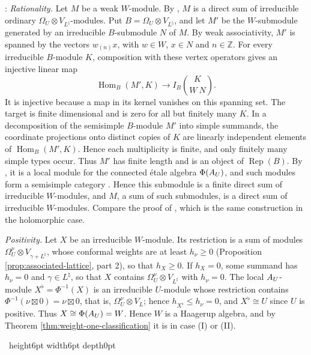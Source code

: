 \documentclass[leqno]{article}
\let\cal\relax
\newcommand{\cal}{\mathcal}
\newcommand{\Z}{\ensuremath{\mathbb{Z}}}
\renewcommand{\leq}{\ensuremath{\leqslant}}
\renewcommand{\geq}{\ensuremath{\geqslant}}
\newcommand{\qed}{\hfill \vrule height6pt  width6pt depth0pt}
\newcommand{\ot}{\otimes}
\DeclareMathOperator{\Rep}{Rep}
\newenvironment{proof}[1][]{\noindent {\it Proof #1} : }{\hbox{~}\qed
\smallskip
}
\numberwithin{equation}{section}
\begin{document}
\begin{proof}
\emph{Rationality.} Let $M$ be a weak $W$-module. By \cite{ABD04}, $M$ is a direct sum of irreducible ordinary $\Omega_U \ot V_{L^\natural}$-modules. Put $B = \Omega_U \ot V_{L^\natural}$, and let $M'$ be the $W$-submodule generated by an irreducible $B$-submodule $N$ of $M$. By weak associativity, $M'$ is spanned by the vectors $w_{(n)}x$, with $w \in W$, $x \in N$ and $n \in \Z$. For every irreducible $B$-module $K$, composition with these vertex operators gives an injective linear map
\[
\operatorname{Hom}_B(M',K) \to I_B\binom{K}{W\ N}.
\]
It is injective because a map in its kernel vanishes on this spanning set. The target is finite dimensional and is zero for all but finitely many $K$. In a decomposition of the semisimple $B$-module $M'$ into simple summands, the coordinate projections onto distinct copies of $K$ are linearly independent elements of $\operatorname{Hom}_B(M',K)$. Hence each multiplicity is finite, and only finitely many simple types occur. Thus $M'$ has finite length and is an object of $\Rep(B)$. By \cite{HKL15,CKM22}, it is a local module for the connected étale algebra $\Phi(\cal A_U)$, and such modules form a semisimple category \cite{DMNO13}. Hence this submodule is a finite direct sum of irreducible $W$-modules, and $M$, a sum of such submodules, is a direct sum of irreducible $W$-modules. Compare the proof of \cite[Proposition 5.3]{MoR24a}, which is the same construction in the holomorphic case.

\emph{Positivity.} Let $X$ be an irreducible $W$-module. Its restriction is a sum of modules $\Omega_U^\nu \ot V_{\gamma+L^\natural}$, whose conformal weights are at least $h_\nu \geq 0$ (Proposition \ref{prop:associated-lattice}, part 2), so that $h_X \geq 0$. If $h_X = 0$, some summand has $h_\nu = 0$ and $\gamma \in L^\natural$, so that $X$ contains $\Omega_U^\nu \ot V_{L^\natural}$ with $h_\nu = 0$. The local $\cal A_U$-module $X^\flat = \Phi^{-1}(X)$ is an irreducible $U$-module whose restriction contains $\Phi^{-1}(\nu \boxtimes 0) = \nu \boxtimes 0$, that is, $\Omega_U^\nu \ot V_L$; hence $h_{X^\flat} \leq h_\nu = 0$, and $X^\flat \cong U$ since $U$ is positive. Thus $X \cong \Phi(\cal A_U) = W$. Hence $W$ is a Haagerup algebra, and by Theorem \ref{thm:weight-one-classification} it is in case (I) or (II).


\end{proof}
\end{document}
